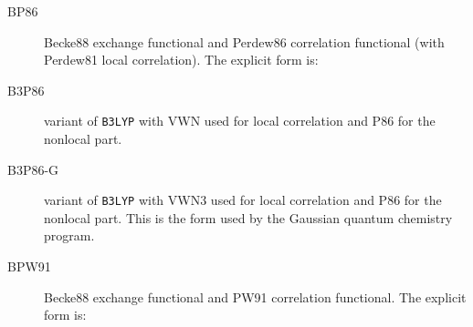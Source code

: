 \begin{description}
\begin{description}

\item[BP86] Becke88 exchange functional and Perdew86 correlation
  functional (with Perdew81 local correlation). The explicit form is:

\item[B3P86] variant of \verb|B3LYP| with VWN used for local
  correlation  and P86 for the nonlocal part.

\item[B3P86-G] variant of \verb|B3LYP| with VWN3 used for local
  correlation and P86 for the nonlocal part.
  This is the form used by the Gaussian quantum chemistry program.

\item[BPW91] Becke88 exchange functional and PW91 correlation
  functional. The explicit form is:






\end{description}
\end{description}
